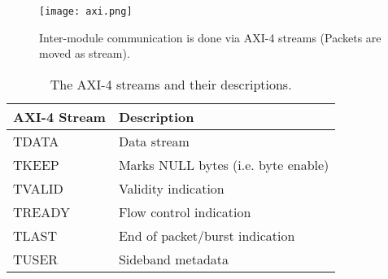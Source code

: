 \begin{figure}[!h]
	\centering
	\texttt{[image: axi.png]}
	\caption{Inter-module communication is done via AXI-4 streams (Packets are moved as stream).}
	\label{fig:axi}
\end{figure}

\begin{table}[!h]
	\centering
	\caption{The AXI-4 streams and their descriptions.}
	\label{tab:axi}
	\begin{tabular}{ | l | l |}
		\hline
		\textbf{AXI-4 Stream} & \textbf{Description} \\ \hline
		TDATA & Data stream \\ \hline
		TKEEP & Marks NULL bytes (i.e. byte enable) \\ \hline
		TVALID & Validity indication \\ \hline
		TREADY & Flow control indication \\ \hline
		TLAST & End of packet/burst indication \\ \hline
		TUSER & Sideband metadata \\ \hline
	\end{tabular}
\end{table}